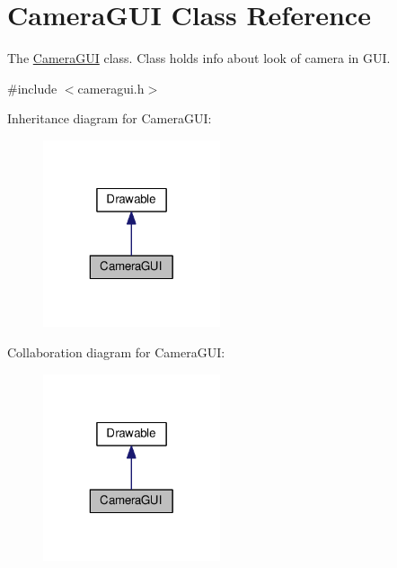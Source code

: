 \hypertarget{classCameraGUI}{\section{Camera\-G\-U\-I Class Reference}
\label{classCameraGUI}
}


The \hyperlink{classCameraGUI}{Camera\-G\-U\-I} class. Class holds info about look of camera in G\-U\-I.  




{\ttfamily \#include $<$cameragui.\-h$>$}



Inheritance diagram for Camera\-G\-U\-I\-:
\nopagebreak
\begin{figure}[H]
\begin{center}
\leavevmode
\includegraphics[width=148pt]{classCameraGUI__inherit__graph}
\end{center}
\end{figure}


Collaboration diagram for Camera\-G\-U\-I\-:
\nopagebreak
\begin{figure}[H]
\begin{center}
\leavevmode
\includegraphics[width=148pt]{classCameraGUI__coll__graph}
\end{center}
\end{figure}
